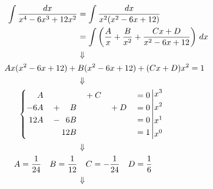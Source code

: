     \begin{align*}
        \int \frac{dx}{x^4 - 6x^3 + 12x^2}
            &= \int \frac{dx}{x^2(x^2 - 6x + 12)} \\
            &= \int \paren{\frac{A}{x} + \frac{B}{x^2}
                                       + \frac{Cx+D}{x^2 - 6x + 12}} \, dx \\
            &\deduce \\
        Ax(x^2 - 6x + 12) +{} &B(x^2 - 6x + 12) + (Cx+D)x^2 = 1 \\
            &\deduce \\
        &\hspace{-1in}\left\{\begin{aligned}
              &A && & {}+{} &C && &&= 0 \\
            -6&A & {}+\phantom{12} &B && &{}+{}&D &&= 0 \\
            12&A & {}-\phantom{1}6 &B && && &&= 0 \\
              &  & 12 &B && && &&= 1
        \end{aligned}\,\middle|
        \begin{aligned}
            x^3 \\ x^2 \\ x^1 \\ x^0
        \end{aligned}\right. \\
            &\deduce \\
        A=\frac1{24} \quad B=\frac{1}{12}
            &\quad C=-\frac1{24} \quad D=\frac16 \\
            &\deduce
    \end{align*}
    
